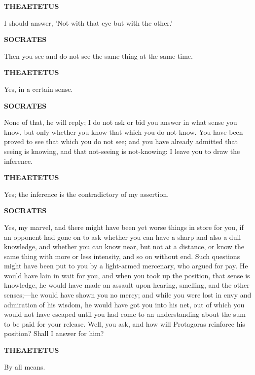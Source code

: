 \documentclass[11pt,letter]{article}
\begin{document}
\par \textbf{THEAETETUS}
\par   I should answer, 'Not with that eye but with the other.'

\par \textbf{SOCRATES}
\par   Then you see and do not see the same thing at the same time.

\par \textbf{THEAETETUS}
\par   Yes, in a certain sense.

\par \textbf{SOCRATES}
\par   None of that, he will reply; I do not ask or bid you answer in what sense you know, but only whether you know that which you do not know. You have been proved to see that which you do not see; and you have already admitted that seeing is knowing, and that not-seeing is not-knowing:  I leave you to draw the inference.

\par \textbf{THEAETETUS}
\par   Yes; the inference is the contradictory of my assertion.

\par \textbf{SOCRATES}
\par   Yes, my marvel, and there might have been yet worse things in store for you, if an opponent had gone on to ask whether you can have a sharp and also a dull knowledge, and whether you can know near, but not at a distance, or know the same thing with more or less intensity, and so on without end. Such questions might have been put to you by a light-armed mercenary, who argued for pay. He would have lain in wait for you, and when you took up the position, that sense is knowledge, he would have made an assault upon hearing, smelling, and the other senses;—he would have shown you no mercy; and while you were lost in envy and admiration of his wisdom, he would have got you into his net, out of which you would not have escaped until you had come to an understanding about the sum to be paid for your release. Well, you ask, and how will Protagoras reinforce his position? Shall I answer for him?

\par \textbf{THEAETETUS}
\par   By all means.
\end{document}
